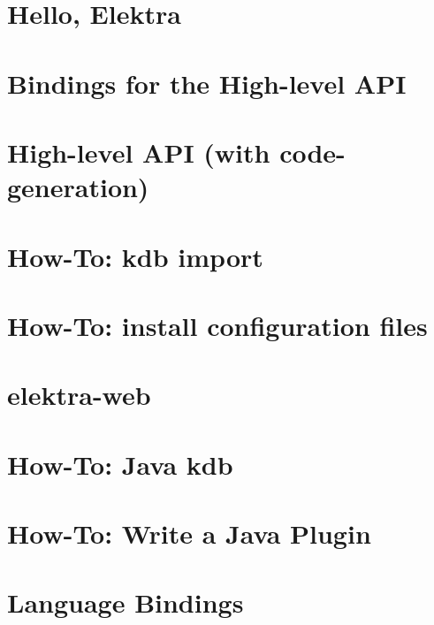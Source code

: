 \documentclass[twoside]{book}
\newcommand{\+}{\discretionary{\mbox{\scriptsize$\hookleftarrow$}}{}{}}
\begin{document}
\chapter{Hello, Elektra}
\label{doc_tutorials_hello-elektra_md}

\chapter{Bindings for the High-\/level A\+PI}
\label{doc_tutorials_highlevel-bindings_md}

\chapter{High-\/level A\+PI (with code-\/generation)}
\label{doc_tutorials_highlevel_md}

\chapter{How-\/\+To\+: kdb import}
\label{doc_tutorials_import_md}

\chapter{How-\/\+To\+: install configuration files}
\label{doc_tutorials_install-config-files_md}

\chapter{elektra-\/web}
\label{doc_tutorials_install-webui_md}

\chapter{How-\/\+To\+: Java kdb}
\label{doc_tutorials_java-kdb_md}

\chapter{How-\/\+To\+: Write a Java Plugin}
\label{doc_tutorials_java-plugins_md}

\chapter{Language Bindings}
\label{doc_tutorials_language-bindings_md}

\end{document}
